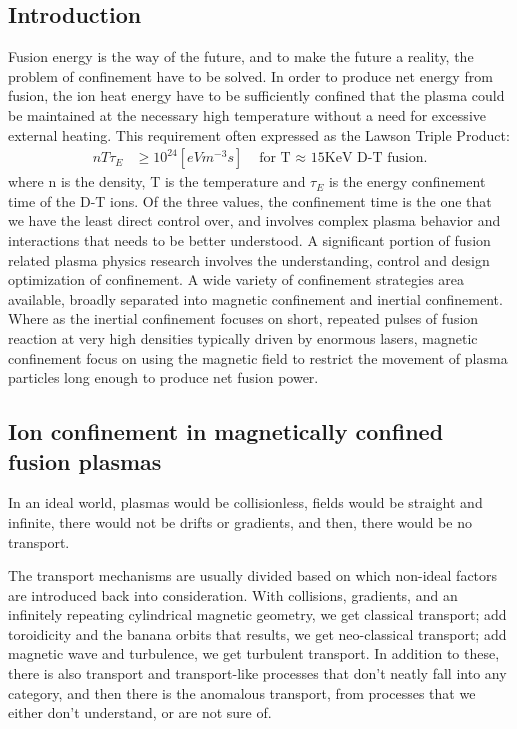 \begin{refsection}

\chapter{Introduction}

Fusion energy is the way of the future, and to make the future a reality, the problem of confinement have to be solved. 
In order to produce net energy from fusion, the ion heat energy have to be sufficiently confined that the plasma could be maintained at the necessary high temperature without a need for excessive external heating. This requirement often expressed as the Lawson Triple Product:
\begin{align}
    nT\tau_{E} &\geq 10^{24} [eV m^{-3}s] &\text{  for T $\approx$ 15KeV D-T fusion.}
\end{align}
where n is the density, T is the temperature and $\tau_{E}$ is the energy confinement time of the D-T ions. Of the three values, the confinement time is the one that we have the least direct control over, and involves complex plasma behavior and interactions that needs to be better understood. A significant portion of fusion related plasma physics research involves the understanding, control and design optimization of confinement. A wide variety of confinement strategies area available, broadly separated into magnetic confinement and inertial confinement. Where as the inertial confinement focuses on short, repeated pulses of fusion reaction at very high densities typically driven by enormous lasers, magnetic confinement focus on using the magnetic field to restrict the movement of plasma particles long enough to produce net fusion power. 


\section{Ion confinement in magnetically confined fusion plasmas}

In an ideal world, plasmas would be collisionless, fields would be straight and infinite, there would not be drifts or gradients, and then, there would be no transport. 

The transport mechanisms are usually divided based on which non-ideal factors are introduced back into consideration. With collisions, gradients, and an infinitely repeating cylindrical magnetic geometry, we get classical transport; add toroidicity and the banana orbits that results, we get neo-classical transport; add magnetic wave and turbulence, we get turbulent transport. In addition to these, there is also transport and transport-like processes that don't neatly fall into any category, and then there is the anomalous transport, from processes that we either don't understand, or are not sure of.


\end{refsection}
